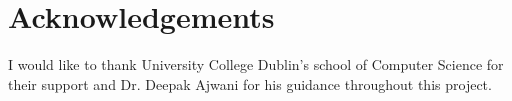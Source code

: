 \documentclass[]{UCD_CS_FYP_Report}
\begin{document}
%


\chapter*{Acknowledgements}
I would like to thank University College Dublin’s school of Computer Science for their support and Dr. Deepak Ajwani for his guidance throughout this project. 


\printbibliography


\end{document}
